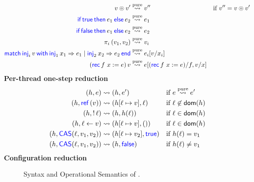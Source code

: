 {\begin{align*}
  v \binop v' & \stepstopure v'' & & \text{if $v''= v \binop v'$} \\
  \If{\True}then{e_1}\Else{e_2} &\stepstopure e_1\\
  \If{\False}then{e_1}\Else{e_2} &\stepstopure e_2\\
  \Proj{i}(v_1,v_2) &\stepstopure v_i\\
  \Match{\Inj{i}v}with{\Inj{1}x_1}=>{e_1}|{\Inj{2}x_2}=>{e_2}end &\stepstopure e_i[v/x_i]\\
  (\Rec{f} x = e)\, v &\stepstopure e[(\Rec{f} x = e) / f, v / x]
\end{align*}
\textbf{Per-thread one-step reduction}
\begin{align*}
  (h,e) & \stepsto (h,e')
  &&\text{if $e\stepstopure e'$} \\
  (h, \Ref(v)) &\stepsto (h[\ell \mapsto v], \ell) 
  & &\text{if $\ell \not \in \dom(h)$}\\
  (h, \deref \ell) &\stepsto (h, h(\ell)) 
    & &\text{if $\ell \in \dom(h)$}
\\
  (h, \ell \gets v) &\stepsto \left(h[\ell \mapsto v], \TT\right) 
    & &\text{if $\ell\in\dom(h)$}
\\
  (h,\CAS(\ell,v_1,v_2)) & \stepsto \left(h[\ell\mapsto  v_2],\True\right)
 && \text{if $h(\ell) = v_1$} \\
(h,\CAS(\ell,v_1,v_2)) & \stepsto \left(h,\False\right)
 &&  \text{if $h(\ell) \neq v_1$}
\end{align*}
\textbf{Configuration reduction}
}

%
\begin{figure}[htbp]
  \opsem
  \caption{Syntax and Operational Semantics of \proglang.}
  \label{fig:opsem}
\end{figure}

